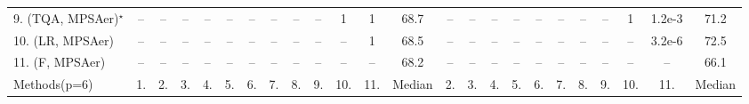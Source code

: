 \begin{table}[ht]
{\begin{tabular}{l|cccccccccccc|ccccccccccc|}
9. (TQA, MPSAer)$^\star$ & -- & -- & -- & -- & -- & -- & -- & -- & -- & 1 & 1 & 68.7 & -- & -- & -- & -- & -- & -- & -- & -- & 1 & {\cellcolor[HTML]{309950}} \color[HTML]{F1F1F1} 1.2e-3 & 71.2 \\
10. (LR, MPSAer) & -- & -- & -- & -- & -- & -- & -- & -- & -- & -- & 1 & 68.5 & -- & -- & -- & -- & -- & -- & -- & -- & -- & {\cellcolor[HTML]{00441B}} \color[HTML]{F1F1F1} 3.2e-6 & 72.5 \\
11. (F, MPSAer) & -- & -- & -- & -- & -- & -- & -- & -- & -- & -- & -- & 68.2 & -- & -- & -- & -- & -- & -- & -- & -- & -- & -- & 66.1 \\
\hline

Methods(p=6) & 1. & 2. & 3. & 4. & 5. & 6. & 7. & 8. & 9. & 10. & 11. & Median & 2. & 3. & 4. & 5. & 6. & 7. & 8. & 9. & 10. & 11. & Median \\
\hline


\end{tabular}}
\end{table}
